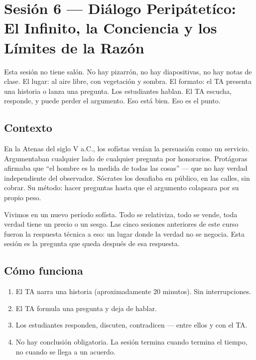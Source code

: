 \documentclass[11pt, letterpaper]{article}
\begin{document}
\newpage

\section{Sesi\'on 6 --- Di\'alogo Perip\'atet\'ico: El Infinito, la Conciencia y los L\'imites de la Raz\'on}

\begin{peripatetic}
Esta sesi\'on no tiene sal\'on. No hay pizarr\'on, no hay diapositivas, no hay notas de clase.
El lugar: al aire libre, con vegetaci\'on y sombra. El formato: el TA presenta una historia o lanza una pregunta. Los estudiantes hablan. El TA escucha, responde, y puede perder el argumento. Eso est\'a bien. Eso es el punto.
\end{peripatetic}

\vspace{0.5em}

\subsection*{Contexto}

En la Atenas del siglo V a.C., los sof\'istas ven\'ian la persuasi\'on como un servicio. Argumentaban cualquier lado de cualquier pregunta por honorarios. Prot\'agoras afirmaba que ``el hombre es la medida de todas las cosas'' --- que no hay verdad independiente del observador. S\'ocrates los desafiaba en p\'ublico, en las calles, sin cobrar. Su m\'etodo: hacer preguntas hasta que el argumento colapsara por su propio peso.

Vivimos en un nuevo per\'iodo sof\'ista. Todo se relativiza, todo se vende, toda verdad tiene un precio o un sesgo. Las cinco sesiones anteriores de este curso fueron la respuesta t\'ecnica a eso: un lugar donde la verdad no se negocia. Esta sesi\'on es la pregunta que queda despu\'es de esa respuesta.

\subsection*{C\'omo funciona}

\begin{enumerate}
  \item El TA narra una historia (aproximadamente 20 minutos). Sin interrupciones.
  \item El TA formula una pregunta y deja de hablar.
  \item Los estudiantes responden, discuten, contradicen --- entre ellos y con el TA.
  \item No hay conclusi\'on obligatoria. La sesi\'on termina cuando termina el tiempo, no cuando se llega a un acuerdo.
\end{enumerate}
\end{document}

